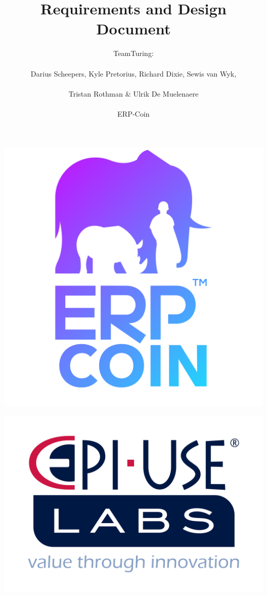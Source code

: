 \documentclass{article}
\title{Requirements and Design Document}
\author{TeamTuring:\\\\Darius Scheepers, Kyle Pretorius, Richard Dixie, Sewis van Wyk,\\\\ Tristan Rothman \& Ulrik De Muelenaere\\\\ ERP-Coin}
\date{}
\begin{document}
\maketitle
\begin{center}
\includegraphics[scale=0.1]{erp-logo.png}
\end{center}

\begin{center}
\includegraphics[scale=0.15]{epi-use.png}
\end{center}
\end{document}
